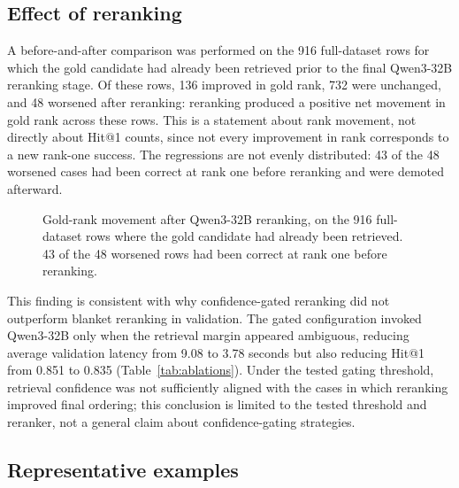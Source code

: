 \subsection{Effect of reranking}

A before-and-after comparison was performed on the 916 full-dataset rows for which the gold candidate had already been retrieved prior to the final Qwen3-32B reranking stage. Of these rows, 136 improved in gold rank, 732 were unchanged, and 48 worsened after reranking: reranking produced a positive net movement in gold rank across these rows. This is a statement about rank movement, not directly about Hit@1 counts, since not every improvement in rank corresponds to a new rank-one success. The regressions are not evenly distributed: 43 of the 48 worsened cases had been correct at rank one before reranking and were demoted afterward.

\begin{figure}[htbp]
\centering
{}
\caption{Gold-rank movement after Qwen3-32B reranking, on the 916 full-dataset rows where the gold candidate had already been retrieved. 43 of the 48 worsened rows had been correct at rank one before reranking.}
\label{fig:rerank-movement}
\end{figure}

This finding is consistent with why confidence-gated reranking did not outperform blanket reranking in validation. The gated configuration invoked Qwen3-32B only when the retrieval margin appeared ambiguous, reducing average validation latency from 9.08 to 3.78 seconds but also reducing Hit@1 from 0.851 to 0.835 (Table~\ref{tab:ablations}). Under the tested gating threshold, retrieval confidence was not sufficiently aligned with the cases in which reranking improved final ordering; this conclusion is limited to the tested threshold and reranker, not a general claim about confidence-gating strategies.

\subsection{Representative examples}


